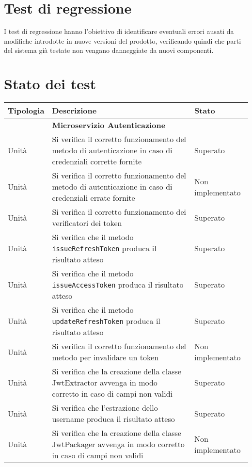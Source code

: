 \section{Test di regressione}
I test di regressione hanno l'obiettivo di identificare eventuali errori ausati da modifiche introdotte in nuove versioni del prodotto, verificando quindi che parti del sistema già testate non vengano danneggiate da nuovi componenti.

\section{Stato dei test}

\begin{center}
    \begin{xltabular}{\linewidth}{|l|X|l|}
        \hline
        \textbf{Tipologia} & \textbf{Descrizione} & \textbf{Stato}\\
        \hline
        & \textbf{Microservizio Autenticazione} & \\
        Unità & Si verifica il corretto funzionamento del metodo di autenticazione in caso di credenziali corrette fornite & Superato\\
        Unità & Si verifica il corretto funzionamento del metodo di autenticazione in caso di credenziali errate fornite & Non implementato\\
        Unità & Si verifica il corretto funzionamento dei verificatori dei token & Superato\\
        Unità & Si verifica che il metodo \texttt{issueRefreshToken} produca il risultato atteso & Superato\\
        Unità & Si verifica che il metodo \texttt{issueAccessToken} produca il risultato atteso & Superato\\
        Unità & Si verifica che il metodo \texttt{updateRefreshToken} produca il risultato atteso & Superato\\
        Unità & Si verifica il corretto funzionamento del metodo per invalidare un token & Non implementato\\
        Unità & Si verifica che la creazione della classe JwtExtractor avvenga in modo corretto in caso di campi non validi & Superato\\
        Unità & Si verifica che l'estrazione dello username produca il risultato atteso & Superato\\
        Unità & Si verifica che la creazione della classe JwtPackager avvenga in modo corretto in caso di campi non validi & Non implementato\\

\end{xltabular}
\end{center}
